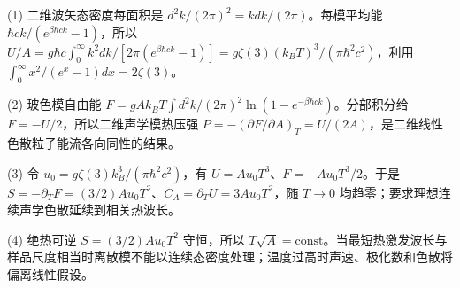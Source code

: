 (1) 二维波矢态密度每面积是 \(d^2k/(2\pi)^2=kdk/(2\pi)\)。每模平均能 \(\hbar ck/(e^{\beta\hbar ck}-1)\)，所以 \(U/A=g\hbar c\int_0^\infty k^2dk/[2\pi(e^{\beta\hbar ck}-1)]=\boxed{g\zeta(3)(k_BT)^3/(\pi\hbar^2c^2)}\)，利用 \(\int_0^\infty x^2/(e^x-1)dx=2\zeta(3)\)。

(2) 玻色模自由能 \(F=gAk_BT\int d^2k/(2\pi)^2\ln(1-e^{-\beta\hbar ck})\)。分部积分给 \(F=-U/2\)，所以二维声学模热压强 \(P=-(\partial F/\partial A)_T=U/(2A)\)，是二维线性色散粒子能流各向同性的结果。

(3) 令 \(u_0=g\zeta(3)k_B^3/(\pi\hbar^2c^2)\)，有 \(U=A u_0T^3\)、\(F=-Au_0T^3/2\)。于是 \(S=-\partial_TF=(3/2)Au_0T^2\)、\(C_A=\partial_TU=3Au_0T^2\)，随 \(T\to0\) 均趋零；要求理想连续声学色散延续到相关热波长。

(4) 绝热可逆 \(S=(3/2)Au_0T^2\) 守恒，所以 \(\boxed{T\sqrt A=\mathrm{const}}\)。当最短热激发波长与样品尺度相当时离散模不能以连续态密度处理；温度过高时声速、极化数和色散将偏离线性假设。
